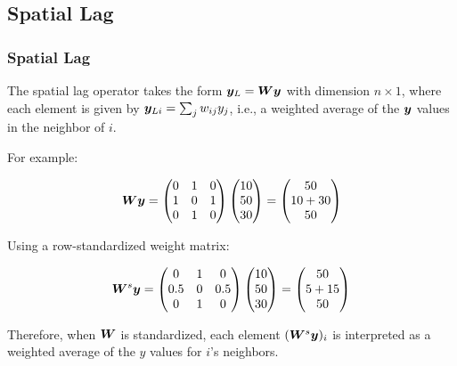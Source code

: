 \documentclass[english,10pt]{beamer}\usepackage[]{graphicx}\usepackage[]{xcolor}
\begin{document}
\subsection{Spatial Lag}

\begin{frame}
  \frametitle{Spatial Lag}
The spatial lag operator takes the form $\bm y_L = \bm W\bm y$ with dimension $n \times 1$, where each element is given by $\bm y_{Li} = \sum_{j}w_{ij}y_j$, i.e., a weighted average of the $\bm y$ values in the neighbor of $i$.

For example:


\begin{equation}
  \bm W\bm y =    \begin{pmatrix}
     0 & 1 & 0 \\
     1 & 0 & 1 \\
     0 & 1 & 0
  \end{pmatrix}
  \begin{pmatrix}
     10 \\
     50 \\
     30
  \end{pmatrix} =
  \begin{pmatrix}
     50 \\
     10 + 30 \\
     50
  \end{pmatrix}
\end{equation}

Using a row-standardized weight matrix:

\begin{equation}
  \bm W^s\bm y =    \begin{pmatrix}
     0 & 1 & 0 \\
     0.5 & 0 & 0.5 \\
     0 & 1 & 0
  \end{pmatrix}
  \begin{pmatrix}
     10 \\
     50 \\
     30
  \end{pmatrix} =
  \begin{pmatrix}
     50 \\
     5 + 15 \\
     50
  \end{pmatrix}
\end{equation}

Therefore, when $\bm W$ is standardized, each element $(\bm W^s\bm y)_i$ is interpreted as a weighted average of the $y$ values for $i$'s neighbors. 

\end{frame}
\end{document}
